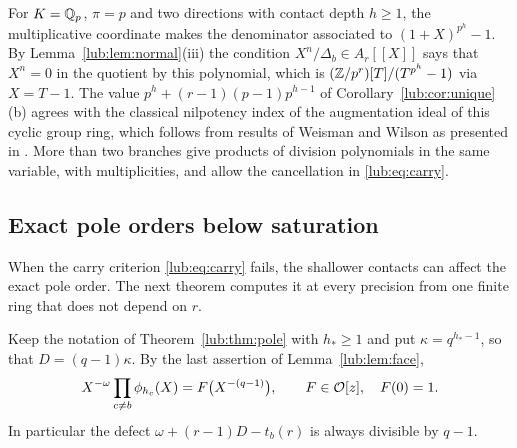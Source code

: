 \begin{remark}\label{lub:rem:classical}
For $K=\mathbb{Q}_p$, $\pi=p$ and two directions with contact depth $h\ge1$, the multiplicative
coordinate makes the denominator associated to $(1+X)^{p^h}-1$. By
Lemma~\ref{lub:lem:normal}(iii) the condition $X^n/\Delta_b\in A_r[[X]]$ says that $X^n=0$ in
the quotient by this polynomial, which is $(\mathbb{Z}/p^r)[T]/(T^{p^h}-1)$ via $X=T-1$. The value
$p^h+(r-1)(p-1)p^{h-1}$ of Corollary~\ref{lub:cor:unique}(b) agrees with the classical nilpotency
index of the augmentation ideal of this cyclic group ring, which follows from results of
Weisman and Wilson as presented in \cite[Theorem~4.7]{ClarkSchauz2022Functional}. More than
two branches give products of division polynomials in the same variable, with
multiplicities, and allow the cancellation in \eqref{lub:eq:carry}.
\end{remark}

\subsection{Exact pole orders below saturation}\label{lub:ssec:exact}
\begingroup\raggedright{}\endgroup

When the carry criterion \eqref{lub:eq:carry} fails, the shallower contacts can affect the
exact pole order. The next theorem computes it at every precision from one finite ring
that does not depend on $r$.

Keep the notation of Theorem~\ref{lub:thm:pole} with $h_*\ge1$ and put $\kappa=q^{h_*-1}$, so that
$D=(q-1)\kappa$. By the last assertion of Lemma~\ref{lub:lem:face},
\begin{equation}\label{lub:eq:F}
 X^{-\omega}\prod_{c\ne b}\phi_{h_c}(X)=F\bigl(X^{-(q-1)}\bigr),\qquad F\in\mathcal{O}[z],\quad F(0)=1 .
\end{equation}
In particular the defect $\omega+(r-1)D-t_b(r)$ is always divisible by $q-1$.

